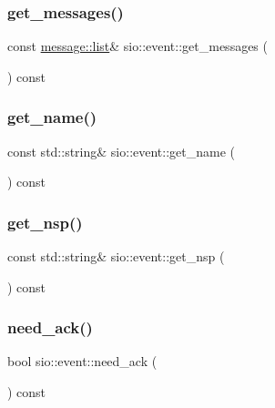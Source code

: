 \mbox{\label{classsio_1_1event_aaeab1effd6c5d26a8da946b13c42437d}} 
\subsubsection{\texorpdfstring{get\+\_\+messages()}{get\_messages()}}
{\footnotesize\ttfamily const \hyperlink{classsio_1_1message_1_1list}{message\+::list}\& sio\+::event\+::get\+\_\+messages (\begin{DoxyParamCaption}{ }\end{DoxyParamCaption}) const}

\mbox{\label{classsio_1_1event_ac5049d464f6b37a92739bbbaee700f7f}} 
\subsubsection{\texorpdfstring{get\+\_\+name()}{get\_name()}}
{\footnotesize\ttfamily const std\+::string\& sio\+::event\+::get\+\_\+name (\begin{DoxyParamCaption}{ }\end{DoxyParamCaption}) const}

\mbox{\label{classsio_1_1event_a248d2f8a20d6915059ec8cee5cf7449d}} 
\subsubsection{\texorpdfstring{get\+\_\+nsp()}{get\_nsp()}}
{\footnotesize\ttfamily const std\+::string\& sio\+::event\+::get\+\_\+nsp (\begin{DoxyParamCaption}{ }\end{DoxyParamCaption}) const}

\mbox{\label{classsio_1_1event_ac6e186489b8452bbc32cc734b3dc099c}} 
\subsubsection{\texorpdfstring{need\+\_\+ack()}{need\_ack()}}
{\footnotesize\ttfamily bool sio\+::event\+::need\+\_\+ack (\begin{DoxyParamCaption}{ }\end{DoxyParamCaption}) const}

